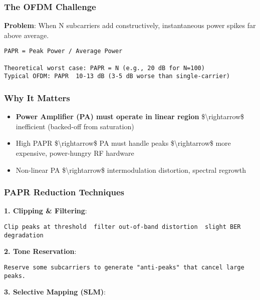 \subsubsection{The OFDM Challenge}\label{the-ofdm-challenge}

\textbf{Problem}: When N subcarriers add constructively, instantaneous
power spikes far above average.

\begin{verbatim}
PAPR = Peak Power / Average Power

Theoretical worst case: PAPR = N (e.g., 20 dB for N=100)
Typical OFDM: PAPR  10-13 dB (3-5 dB worse than single-carrier)
\end{verbatim}

\subsubsection{Why It Matters}\label{why-it-matters}

\begin{itemize}
\tightlist
\item
  \textbf{Power Amplifier (PA) must operate in linear region}
  \$\textbackslash rightarrow\$ inefficient (backed-off from saturation)
\item
  High PAPR \$\textbackslash rightarrow\$ PA must handle peaks
  \$\textbackslash rightarrow\$ more expensive, power-hungry RF hardware
\item
  Non-linear PA \$\textbackslash rightarrow\$ intermodulation
  distortion, spectral regrowth
\end{itemize}

\subsubsection{PAPR Reduction
Techniques}\label{papr-reduction-techniques}

\textbf{1. Clipping \& Filtering}:

\begin{verbatim}
Clip peaks at threshold  filter out-of-band distortion  slight BER degradation
\end{verbatim}

\textbf{2. Tone Reservation}:

\begin{verbatim}
Reserve some subcarriers to generate "anti-peaks" that cancel large peaks.
\end{verbatim}

\textbf{3. Selective Mapping (SLM)}:

